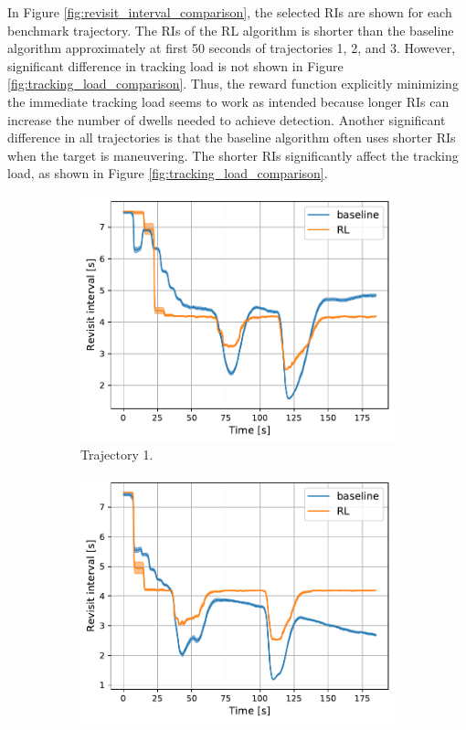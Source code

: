 \documentclass[english, 12pt, a4paper, elec, utf8, a-1b, online]{aaltothesis}
\begin{document}
In Figure \ref{fig:revisit_interval_comparison}, the selected RIs are shown for each benchmark trajectory.
The RIs of the RL algorithm is shorter than the baseline algorithm approximately at first 50 seconds of trajectories 1, 2, and 3.
However, significant difference in tracking load is not shown in Figure \ref{fig:tracking_load_comparison}.
Thus, the reward function explicitly minimizing the immediate tracking load seems to work as intended because longer RIs can increase the number of dwells needed to achieve detection.
Another significant difference in all trajectories is that the baseline algorithm often uses shorter RIs when the target is maneuvering.
The shorter RIs significantly affect the tracking load, as shown in Figure \ref{fig:tracking_load_comparison}.

\begin{figure}
    \centering
    \begin{subfigure}[b]{0.45\textwidth}
        \centering
        \includegraphics[width=\linewidth]{figures/benchmark/Simulations/revisit_intervals_0.pdf}
        \caption{Trajectory 1.}
        \label{fig:RI_T1}
    \end{subfigure}
    \hfill
    \begin{subfigure}[b]{0.45\textwidth}
        \centering
        \includegraphics[width=\linewidth]{figures/benchmark/Simulations/revisit_intervals_1.pdf}

\end{subfigure}
\end{figure}
\end{document}
